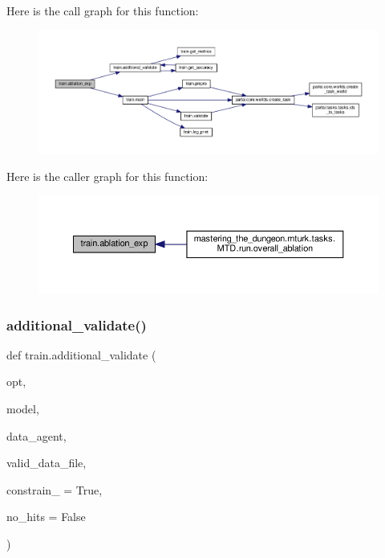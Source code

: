 Here is the call graph for this function\+:
\nopagebreak
\begin{figure}[H]
\begin{center}
\leavevmode
\includegraphics[width=350pt]{namespacetrain_a425ccbcfa57820b4ad788f4c71772f0f_cgraph}
\end{center}
\end{figure}
Here is the caller graph for this function\+:
\nopagebreak
\begin{figure}[H]
\begin{center}
\leavevmode
\includegraphics[width=350pt]{namespacetrain_a425ccbcfa57820b4ad788f4c71772f0f_icgraph}
\end{center}
\end{figure}
\mbox{\label{namespacetrain_a9719cda8ba718637950ea11259aa636c}} 
\subsubsection{\texorpdfstring{additional\+\_\+validate()}{additional\_validate()}}
{\footnotesize\ttfamily def train.\+additional\+\_\+validate (\begin{DoxyParamCaption}\item[{}]{opt,  }\item[{}]{model,  }\item[{}]{data\+\_\+agent,  }\item[{}]{valid\+\_\+data\+\_\+file,  }\item[{}]{constrain\+\_\+ = {\ttfamily True},  }\item[{}]{no\+\_\+hits = {\ttfamily False} }\end{DoxyParamCaption})}



